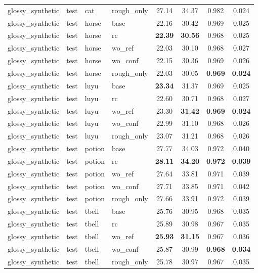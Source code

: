\begin{table}[t]
{\begin{tabular}{llllcccc}
glossy\_synthetic & test & cat & rough\_only & 27.14 & 34.37 & 0.982 & 0.024 \\
glossy\_synthetic & test & horse & base & 22.16 & 30.42 & 0.969 & 0.025 \\
glossy\_synthetic & test & horse & rc & \textbf{22.39} & \textbf{30.56} & 0.968 & 0.025 \\
glossy\_synthetic & test & horse & wo\_ref & 22.03 & 30.10 & 0.968 & 0.027 \\
glossy\_synthetic & test & horse & wo\_conf & 22.15 & 30.36 & 0.969 & 0.026 \\
glossy\_synthetic & test & horse & rough\_only & 22.03 & 30.05 & \textbf{0.969} & \textbf{0.024} \\
glossy\_synthetic & test & luyu & base & \textbf{23.34} & 31.37 & 0.969 & 0.025 \\
glossy\_synthetic & test & luyu & rc & 22.60 & 30.71 & 0.968 & 0.027 \\
glossy\_synthetic & test & luyu & wo\_ref & 23.30 & \textbf{31.42} & \textbf{0.969} & \textbf{0.024} \\
glossy\_synthetic & test & luyu & wo\_conf & 22.99 & 31.10 & 0.968 & 0.026 \\
glossy\_synthetic & test & luyu & rough\_only & 23.07 & 31.21 & 0.968 & 0.026 \\
glossy\_synthetic & test & potion & base & 27.77 & 34.03 & 0.972 & 0.040 \\
glossy\_synthetic & test & potion & rc & \textbf{28.11} & \textbf{34.20} & \textbf{0.972} & \textbf{0.039} \\
glossy\_synthetic & test & potion & wo\_ref & 27.64 & 33.81 & 0.971 & 0.039 \\
glossy\_synthetic & test & potion & wo\_conf & 27.71 & 33.85 & 0.971 & 0.042 \\
glossy\_synthetic & test & potion & rough\_only & 27.66 & 33.91 & 0.972 & 0.039 \\
glossy\_synthetic & test & tbell & base & 25.76 & 30.95 & 0.968 & 0.035 \\
glossy\_synthetic & test & tbell & rc & 25.89 & 30.98 & 0.967 & 0.035 \\
glossy\_synthetic & test & tbell & wo\_ref & \textbf{25.93} & \textbf{31.15} & 0.967 & 0.036 \\
glossy\_synthetic & test & tbell & wo\_conf & 25.87 & 30.99 & \textbf{0.968} & \textbf{0.034} \\
glossy\_synthetic & test & tbell & rough\_only & 25.78 & 30.97 & 0.967 & 0.035 \\

\end{tabular}}
\end{table}
